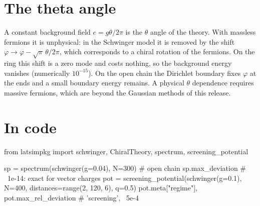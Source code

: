 
\section{The theta angle}
A constant background field $e = g\theta/2\pi$ is the $\theta$ angle of the theory. With massless fermions it is
unphysical: in the Schwinger model it is removed by the shift $\varphi\to\varphi - \sqrt\pi\,\theta/2\pi$, which
corresponds to a chiral rotation of the fermions. On the ring this shift is a zero mode and costs nothing, so the
background energy vanishes (numerically $10^{-15}$). On the open chain the Dirichlet boundary fixes $\varphi$ at the
ends and a small boundary energy remains. A physical $\theta$ dependence requires massive fermions, which are
beyond the Gaussian methods of this release.

\section{In code}
\begin{python}
from latsimpkg import schwinger, ChiralTheory, spectrum, screening_potential

sp = spectrum(schwinger(g=0.04), N=300)          # open chain
sp.max_deviation                                 # ~1e-14: exact for vector charges
pot = screening_potential(schwinger(g=0.1), N=400, distances=range(2, 120, 6), q=0.5)
pot.meta["regime"], pot.max_rel_deviation        # 'screening', ~5e-4
\end{python}
